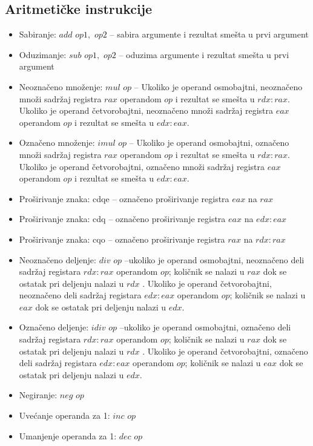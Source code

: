 \documentclass[a4paper, 10pt]{article}
\begin{document}
	\subsection{Aritmetičke instrukcije}
		\begin{itemize}
			\item Sabiranje: $add$ $op1,$ $op2$ -- sabira argumente i rezultat smešta u prvi argument
			\item Oduzimanje: $sub$ $op1,$ $op2$ -- oduzima argumente i rezultat smešta u prvi argument
			\item Neoznačeno množenje: $mul$ $op$ -- Ukoliko je operand osmobajtni, neoznačeno množi sadržaj registra $rax$ operandom $op$ i rezultat se smešta u $rdx:rax$. Ukoliko je operand četvorobajtni, neoznačeno množi sadržaj registra $eax$ operandom $op$ i rezultat se smešta u $edx:eax$.
			\item Označeno množenje: $imul$ $op$ -- Ukoliko je operand osmobajtni, označeno množi sadržaj registra $rax$ operandom $op$ i rezultat se smešta u $rdx:rax$. Ukoliko je operand četvorobajtni, označeno množi sadržaj registra $eax$ operandom $op$ i rezultat se smešta u $edx:eax$.
			\item Proširivanje znaka: cdqe -- označeno proširivanje registra $eax$ na $rax$
			\item Proširivanje znaka: cdq -- označeno proširivanje registra $eax$ na $edx:eax$
			\item Proširivanje znaka: cqo -- označeno proširivanje registra $rax$ na $rdx:rax$
			\item Neoznačeno deljenje: $div$ $op$ --ukoliko je operand osmobajtni, neoznačeno deli sadržaj registara $rdx:rax$ operandom $op$; količnik se nalazi u $rax$ dok se ostatak pri deljenju nalazi u $rdx$ . Ukoliko je operand četvorobajtni, neoznačeno deli sadržaj registara $edx:eax$ operandom $op$; količnik se nalazi u $eax$ dok se ostatak pri deljenju nalazi u $edx$.
			\item Označeno deljenje: $idiv$ $op$ --ukoliko je operand osmobajtni, označeno deli sadržaj registara $rdx:rax$ operandom $op$; količnik se nalazi u $rax$ dok se ostatak pri deljenju nalazi u $rdx$ . Ukoliko je operand četvorobajtni, označeno deli sadržaj registara $edx:eax$ operandom $op$; količnik se nalazi u $eax$ dok se ostatak pri deljenju nalazi u $edx$.
			\item Negiranje: $neg$ $op$
			\item Uvećanje operanda za 1: $inc$ $op$
			\item Umanjenje operanda za 1: $dec$ $op$
		\end{itemize}
\end{document}
